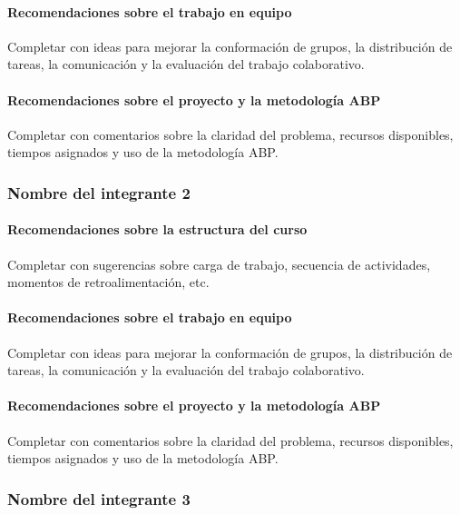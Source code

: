 \documentclass[11pt,a4paper]{article}
\begin{document}
\paragraph{Recomendaciones sobre el trabajo en equipo}
Completar con ideas para mejorar la conformación de grupos, la distribución
de tareas, la comunicación y la evaluación del trabajo colaborativo.

\paragraph{Recomendaciones sobre el proyecto y la metodología ABP}
Completar con comentarios sobre la claridad del problema, recursos
disponibles, tiempos asignados y uso de la metodología ABP.

\subsubsection*{Nombre del integrante 2}

\paragraph{Recomendaciones sobre la estructura del curso}
Completar con sugerencias sobre carga de trabajo, secuencia de actividades,
momentos de retroalimentación, etc.

\paragraph{Recomendaciones sobre el trabajo en equipo}
Completar con ideas para mejorar la conformación de grupos, la distribución
de tareas, la comunicación y la evaluación del trabajo colaborativo.

\paragraph{Recomendaciones sobre el proyecto y la metodología ABP}
Completar con comentarios sobre la claridad del problema, recursos
disponibles, tiempos asignados y uso de la metodología ABP.

\subsubsection*{Nombre del integrante 3}
\end{document}
